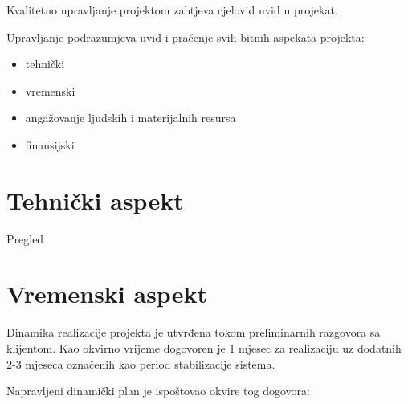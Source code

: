\documentclass[times, utf8, seminar]{fit}
\begin{document}
Kvalitetno upravljanje projektom zahtjeva cjelovid uvid u projekat.  

Upravljanje podrazumjeva uvid i praćenje svih bitnih aspekata projekta:
\begin{itemize}
  \item tehnički
  \item vremenski
  \item angažovanje ljudskih i materijalnih resursa
  \item finansijski
\end{itemize}

\section{Tehnički aspekt}

Pregled 
\pagebreak
\section{Vremenski aspekt}

Dinamika realizacije projekta je utvrđena tokom preliminarnih razgovora sa klijentom. Kao okvirno vrijeme dogovoren je 1 mjesec za realizaciju uz dodatnih 2-3 mjeseca označenih kao period stabilizacije sistema. 

Napravljeni dinamički plan je ispoštovao okvire tog dogovora:
\end{document}
